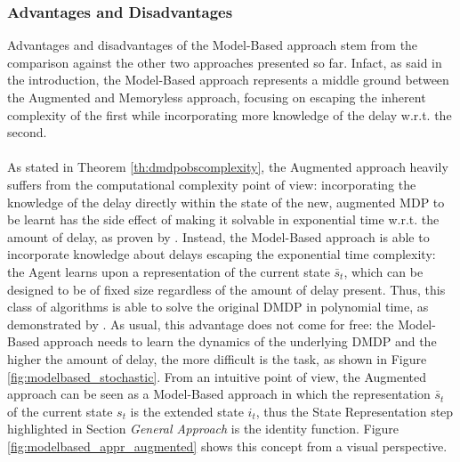             \subsubsection{Advantages and Disadvantages}
                Advantages and disadvantages of the Model-Based approach stem from the comparison against the other two approaches presented so far. Infact, as said in the introduction, the Model-Based approach represents a middle ground between the Augmented and Memoryless approach, focusing on escaping the inherent complexity of the first while incorporating more knowledge of the delay w.r.t. the second. 
                \\\\
                As stated in Theorem \ref{th:dmdpobscomplexity}, the Augmented approach heavily suffers from the computational complexity point of view: incorporating the knowledge of the delay directly within the state of the new, augmented MDP to be learnt has the side effect of making it solvable in exponential time w.r.t. the amount of delay, as proven by . Instead, the Model-Based approach is able to incorporate knowledge about delays escaping the exponential time complexity: the Agent learns upon a representation of the current state $\bar{s}_t$, which can be designed to be of fixed size regardless of the amount of delay present. Thus, this class of algorithms is able to solve the original DMDP in polynomial time, as demonstrated by . As usual, this advantage does not come for free: the Model-Based approach needs to learn the dynamics of the underlying DMDP and the higher the amount of delay, the more difficult is the task, as shown in Figure \ref{fig:modelbased_stochastic}. From an intuitive point of view, the Augmented approach can be seen as a Model-Based approach in which the representation $\bar{s}_t$ of the current state $s_t$ is the extended state $i_t$, thus the State Representation step highlighted in Section \textit{General Approach} is the identity function. Figure \ref{fig:modelbased_appr_augmented} shows this concept from a visual perspective. 
                \\\\
